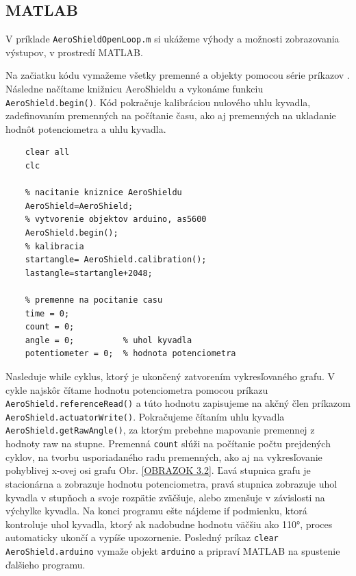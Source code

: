 \newpage
\subsection{MATLAB}
\label{MatlabPID}

V príklade \verb|AeroShieldOpenLoop.m| si ukážeme výhody a možnosti zobrazovania výstupov, v prostredí MATLAB. 

Na začiatku kódu vymažeme všetky premenné a objekty pomocou série príkazov . Následne načítame knižnicu AeroShieldu a vykonáme funkciu \verb|AeroShield.begin()|. Kód pokračuje kalibráciou nulového uhlu kyvadla, zadefinovaním premenných na počítanie času, ako aj premenných na ukladanie hodnôt potenciometra a uhlu kyvadla. 

\begin{lstlisting}[caption={AeroShield open loop inicializacia.},captionpos=b]
	% vymazanie premennych a objektov 
	clear all
	clc 
	
	% nacitanie kniznice AeroShieldu  
	AeroShield=AeroShield;
	% vytvorenie objektov arduino, as5600
	AeroShield.begin();
	% kalibracia
	startangle= AeroShield.calibration(); 
	lastangle=startangle+2048; 
	
	% premenne na pocitanie casu
	time = 0;
	count = 0;
	angle = 0;          % uhol kyvadla
	potentiometer = 0;  % hodnota potenciometra
\end{lstlisting}

Nasleduje while cyklus, ktorý je ukončený zatvorením vykresľovaného grafu. V cykle najskôr čítame hodnotu potenciometra pomocou príkazu \verb|AeroShield.referenceRead()| a túto hodnotu zapisujeme na akčný člen príkazom \verb|AeroShield.actuatorWrite()|. Pokračujeme čítaním uhlu kyvadla \verb|AeroShield.getRawAngle()|, za ktorým prebehne mapovanie premennej z hodnoty raw na stupne. Premenná \verb|count| slúži na počítanie počtu prejdených cyklov, na tvorbu usporiadaného radu premenných, ako aj na vykresľovanie pohyblivej x-ovej osi grafu Obr. \ref{OBRAZOK 3.2}. Ľavá stupnica grafu je stacionárna a zobrazuje hodnotu potenciometra, pravá stupnica zobrazuje uhol kyvadla v stupňoch a svoje rozpätie zväčšuje, alebo zmenšuje v závislosti na výchylke kyvadla. Na konci programu ešte nájdeme if podmienku, ktorá kontroluje uhol kyvadla, ktorý ak nadobudne hodnotu väčšiu ako 110°, proces automaticky ukončí a vypíše upozornenie. Posledný príkaz \verb|clear AeroShield.arduino| vymaže objekt \verb|arduino| a pripraví MATLAB na spustenie ďalšieho programu. 

